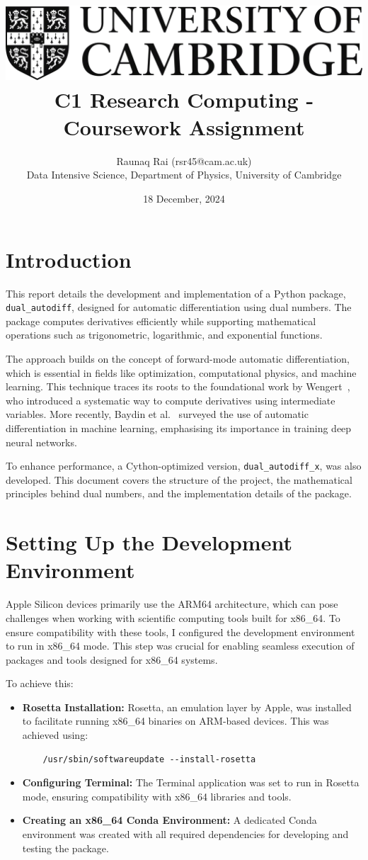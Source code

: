 \documentclass[a4paper,12pt]{article}
\title{
    \includegraphics[scale=0.4]{Cam_logo_bw.png}\\
    \vspace{0.5cm}
    C1 Research Computing - Coursework Assignment
}
\author{Raunaq Rai (rsr45@cam.ac.uk)\\
    Data Intensive Science, Department of Physics, University of Cambridge
}
\date{18 December, 2024}
\begin{document}
\maketitle

\section{Introduction}
This report details the development and implementation of a Python package, \texttt{dual\_autodiff}, designed for automatic differentiation using dual numbers. The package computes derivatives efficiently while supporting mathematical operations such as trigonometric, logarithmic, and exponential functions.

The approach builds on the concept of forward-mode automatic differentiation, which is essential in fields like optimization, computational physics, and machine learning. This technique traces its roots to the foundational work by Wengert~\cite{wengert1964automatic}, who introduced a systematic way to compute derivatives using intermediate variables. More recently, Baydin et al.~\cite{baydin2018automatic} surveyed the use of automatic differentiation in machine learning, emphasising its importance in training deep neural networks.

To enhance performance, a Cython-optimized version, \texttt{dual\_autodiff\_x}, was also developed. This document covers the structure of the project, the mathematical principles behind dual numbers, and the implementation details of the package.

\section{Setting Up the Development Environment}

Apple Silicon devices primarily use the ARM64 architecture, which can pose challenges when working with scientific computing tools built for x86\_64. To ensure compatibility with these tools, I configured the development environment to run in x86\_64 mode. This step was crucial for enabling seamless execution of packages and tools designed for x86\_64 systems.

To achieve this:
\begin{itemize}
    \item \textbf{Rosetta Installation:} Rosetta, an emulation layer by Apple, was installed to facilitate running x86\_64 binaries on ARM-based devices. This was achieved using:
    \begin{verbatim}
    /usr/sbin/softwareupdate --install-rosetta
    \end{verbatim}
    \item \textbf{Configuring Terminal:} The Terminal application was set to run in Rosetta mode, ensuring compatibility with x86\_64 libraries and tools.
    \item \textbf{Creating an x86\_64 Conda Environment:} A dedicated Conda environment was created with all required dependencies for developing and testing the package.
\end{itemize}
\end{document}
